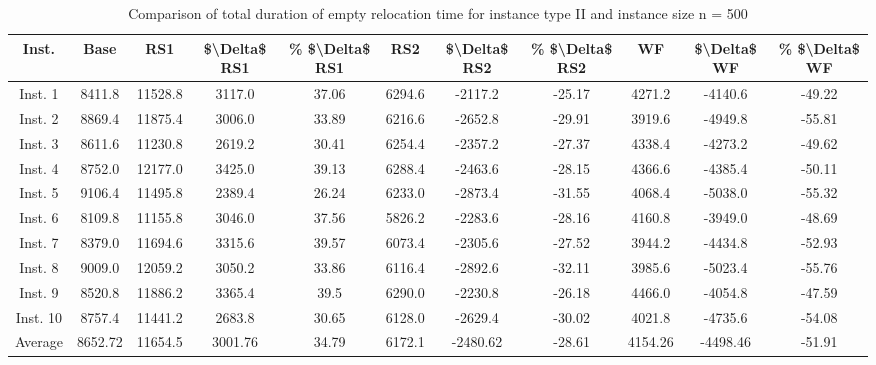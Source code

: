 \begin{table}[H]
\centering
\begin{tabular}{ccccccccccc}
  \hline
  \textbf{Inst.} & \textbf{Base} & \textbf{RS1} & \textbf{\$\textbackslash{}Delta\$  RS1} & \textbf{\% \$\textbackslash{}Delta\$  RS1} & \textbf{RS2} & \textbf{\$\textbackslash{}Delta\$  RS2} & \textbf{\% \$\textbackslash{}Delta\$  RS2} & \textbf{WF} & \textbf{\$\textbackslash{}Delta\$  WF} & \textbf{\% \$\textbackslash{}Delta\$  WF} \\\hline
  Inst. 1 & 8411.8 & 11528.8 & 3117.0 & 37.06 & 6294.6 & -2117.2 & -25.17 & 4271.2 & -4140.6 & -49.22 \\
  Inst. 2 & 8869.4 & 11875.4 & 3006.0 & 33.89 & 6216.6 & -2652.8 & -29.91 & 3919.6 & -4949.8 & -55.81 \\
  Inst. 3 & 8611.6 & 11230.8 & 2619.2 & 30.41 & 6254.4 & -2357.2 & -27.37 & 4338.4 & -4273.2 & -49.62 \\
  Inst. 4 & 8752.0 & 12177.0 & 3425.0 & 39.13 & 6288.4 & -2463.6 & -28.15 & 4366.6 & -4385.4 & -50.11 \\
  Inst. 5 & 9106.4 & 11495.8 & 2389.4 & 26.24 & 6233.0 & -2873.4 & -31.55 & 4068.4 & -5038.0 & -55.32 \\
  Inst. 6 & 8109.8 & 11155.8 & 3046.0 & 37.56 & 5826.2 & -2283.6 & -28.16 & 4160.8 & -3949.0 & -48.69 \\
  Inst. 7 & 8379.0 & 11694.6 & 3315.6 & 39.57 & 6073.4 & -2305.6 & -27.52 & 3944.2 & -4434.8 & -52.93 \\
  Inst. 8 & 9009.0 & 12059.2 & 3050.2 & 33.86 & 6116.4 & -2892.6 & -32.11 & 3985.6 & -5023.4 & -55.76 \\
  Inst. 9 & 8520.8 & 11886.2 & 3365.4 & 39.5 & 6290.0 & -2230.8 & -26.18 & 4466.0 & -4054.8 & -47.59 \\
  Inst. 10 & 8757.4 & 11441.2 & 2683.8 & 30.65 & 6128.0 & -2629.4 & -30.02 & 4021.8 & -4735.6 & -54.08 \\
  Average & 8652.72 & 11654.5 & 3001.76 & 34.79 & 6172.1 & -2480.62 & -28.61 & 4154.26 & -4498.46 & -51.91 \\\hline
\end{tabular}
\caption{Comparison of total duration of empty relocation time for instance type II and instance size n = 500}
\label{tab:wait:resrelocation-empty-relocation-comparison_II_500}
\end{table}
